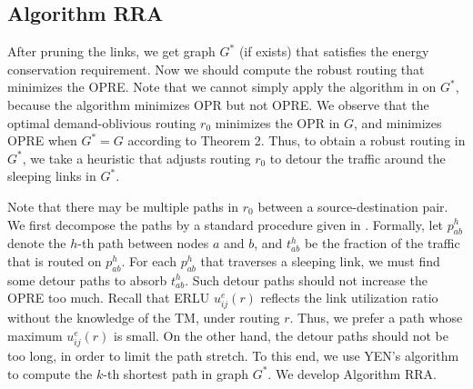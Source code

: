 \documentclass[conference]{IEEEtran}
\begin{document}
\subsection{Algorithm RRA}

After pruning the links, we get graph $G^*$ (if exists) that satisfies the energy conservation requirement. Now we should compute the robust routing that minimizes the OPRE. Note that we cannot simply apply the algorithm in \cite{networking:oblivious} on $G^*$, because the algorithm minimizes OPR but not OPRE. We observe that the optimal demand-oblivious routing $r_0$ minimizes the OPR in $G$, and minimizes OPRE when $G^* = G$ according to Theorem 2. Thus, to obtain a robust routing in $G^*$, we take a heuristic that adjusts routing $r_0$ to detour the traffic around the sleeping links in $G^*$.

Note that there may be multiple paths in $r_0$ between a source-destination pair. We first decompose the paths by a standard procedure given in \cite{networkflow93book}. Formally, let $p^h_{ab}$ denote the $h$-th path between nodes $a$ and $b$, and $t^h_{ab}$ be the fraction of the traffic that is routed on $p^h_{ab}$. For each $p^h_{ab}$ that traverses a sleeping link, we must find some detour paths to absorb $t^h_{ab}$. Such detour paths should not increase the OPRE too much. Recall that ERLU $u^e_{ij}(r)$ reflects the link utilization ratio without the knowledge of the TM, under routing $r$. Thus, we prefer a path whose maximum $u^e_{ij}(r)$ is small. On the other hand, the detour paths should not be too long, in order to limit the path stretch. To this end, we use YEN's algorithm \cite{networking:yens} to compute the $k$-th shortest path in graph $G^*$. We develop Algorithm RRA.
\end{document}
